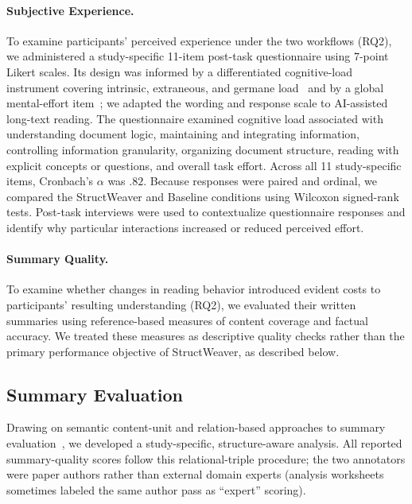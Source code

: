 \documentclass[manuscript,review,anonymous]{acmart}
\begin{document}
\paragraph{Subjective Experience.}
To examine participants' perceived experience under the two workflows (RQ2), we administered a study-specific 11-item post-task questionnaire using 7-point Likert scales. Its design was informed by a differentiated cognitive-load instrument covering intrinsic, extraneous, and germane load~\cite{leppink2013development} and by a global mental-effort item~\cite{paas1992training}; we adapted the wording and response scale to AI-assisted long-text reading. The questionnaire examined cognitive load associated with understanding document logic, maintaining and integrating information, controlling information granularity, organizing document structure, reading with explicit concepts or questions, and overall task effort. Across all 11 study-specific items, Cronbach's $\alpha$ was $.82$. Because responses were paired and ordinal, we compared the StructWeaver and Baseline conditions using Wilcoxon signed-rank tests. Post-task interviews were used to contextualize questionnaire responses and identify why particular interactions increased or reduced perceived effort.

\paragraph{Summary Quality.}
To examine whether changes in reading behavior introduced evident costs to participants' resulting understanding (RQ2), we evaluated their written summaries using reference-based measures of content coverage and factual accuracy. We treated these measures as descriptive quality checks rather than the primary performance objective of StructWeaver, as described below.

\subsection{Summary Evaluation}
\label{sec:summary-eval}

Drawing on semantic content-unit and relation-based approaches to summary evaluation~\cite{nenkova-passonneau-2004-evaluating,hovy-etal-2006-automated}, we developed a study-specific, structure-aware analysis. All reported summary-quality scores follow this relational-triple procedure; the two annotators were paper authors rather than external domain experts (analysis worksheets sometimes labeled the same author pass as ``expert'' scoring).
\end{document}

